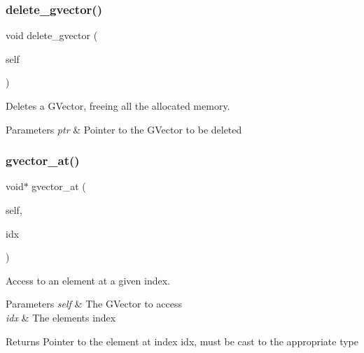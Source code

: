 \subsubsection{\texorpdfstring{delete\+\_\+gvector()}{delete\_gvector()}}
{\footnotesize\ttfamily void delete\+\_\+gvector (\begin{DoxyParamCaption}\item[{\hyperlink{group___g_vector_ga6d90d5e6b721779a43354f2752b79281}{G\+Vector} $\ast$}]{self }\end{DoxyParamCaption})}



Deletes a G\+Vector, freeing all the allocated memory. 


\begin{DoxyParams}{Parameters}
{\em ptr} & Pointer to the G\+Vector to be deleted \\
\hline
\end{DoxyParams}
\hypertarget{group___g_vector_ga01efe5e5a35c4656de07aa3b1c937b0b}{}\label{group___g_vector_ga01efe5e5a35c4656de07aa3b1c937b0b} 
\subsubsection{\texorpdfstring{gvector\+\_\+at()}{gvector\_at()}}
{\footnotesize\ttfamily void$\ast$ gvector\+\_\+at (\begin{DoxyParamCaption}\item[{\hyperlink{group___g_vector_ga6d90d5e6b721779a43354f2752b79281}{G\+Vector} $\ast$}]{self,  }\item[{unsigned}]{idx }\end{DoxyParamCaption})}



Access to an element at a given index. 


\begin{DoxyParams}{Parameters}
{\em self} & The G\+Vector to access \\
\hline
{\em idx} & The element\textquotesingle{}s index\\
\hline
\end{DoxyParams}
\begin{DoxyReturn}{Returns}
Pointer to the element at index idx, must be cast to the appropriate type 
\end{DoxyReturn}
\hypertarget{group___g_vector_ga58f71f3cb3c10d00005e3f58951a9184}{}\label{group___g_vector_ga58f71f3cb3c10d00005e3f58951a9184} 
